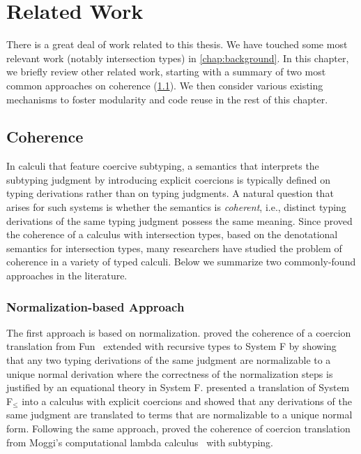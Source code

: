 
\chapter{Related Work}
\label{sec:related}


There is a great deal of work related to this thesis. We have touched some most
relevant work (notably intersection types) in \cref{chap:background}. In this
chapter, we briefly review other related work, starting with a summary of two
most common approaches on coherence (\cref{sec:related:coherence}). We then
consider various existing mechanisms to foster modularity and code reuse in the
rest of this chapter.


\section{Coherence}
\label{sec:related:coherence}

In calculi that feature coercive subtyping, a semantics that interprets the
subtyping judgment by introducing explicit coercions is typically defined on
typing derivations rather than on typing judgments. A natural question that
arises for such systems is whether the semantics is \textit{coherent}, i.e.,
distinct typing derivations of the same typing judgment possess the same
meaning. Since \citet{Reynolds_1991} proved the coherence of a calculus with
intersection types, based on the denotational semantics for intersection types,
many researchers have studied the problem of coherence in a variety of typed
calculi. Below we summarize two commonly-found approaches in the literature.

\subsection{Normalization-based Approach}
The first approach is based on normalization. \citet{Breazu_Tannen_1991} proved
the coherence of a coercion translation from
\textsf{Fun}~\citep{cardelli1985understanding} extended with recursive types to
System F by showing that any two typing derivations of the same judgment are
normalizable to a unique normal derivation where the correctness of the
normalization steps is justified by an equational theory in System F.
\citet{Curien_1992} presented a translation of System F$_\leq$ into a calculus
with explicit coercions and showed that any derivations of the same judgment are
translated to terms that are normalizable to a unique normal form. Following the
same approach, \citet{SCHWINGHAMMER_2008} proved the coherence of coercion
translation from Moggi's computational lambda calculus~\citep{Moggi_1991} with
subtyping.


